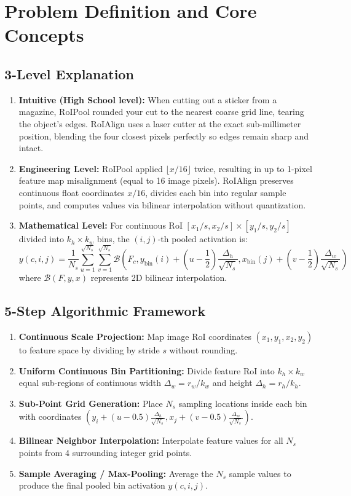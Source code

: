 \documentclass[11pt,a4paper]{article}
\theoremstyle{definition}
\begin{document}
\section{Problem Definition and Core Concepts}

\subsection{3-Level Explanation}
\begin{enumerate}
    \item \textbf{Intuitive (High School level):} When cutting out a sticker from a magazine, RoIPool rounded your cut to the nearest coarse grid line, tearing the object's edges. RoIAlign uses a laser cutter at the exact sub-millimeter position, blending the four closest pixels perfectly so edges remain sharp and intact.
    \item \textbf{Engineering Level:} RoIPool applied $\lfloor x/16 \rfloor$ twice, resulting in up to 1-pixel feature map misalignment (equal to 16 image pixels). RoIAlign preserves continuous float coordinates $x/16$, divides each bin into regular sample points, and computes values via bilinear interpolation without quantization.
    \item \textbf{Mathematical Level:} For continuous RoI $[x_1/s, x_2/s] \times [y_1/s, y_2/s]$ divided into $k_h \times k_w$ bins, the $(i, j)$-th pooled activation is:
    \begin{equation}
    y(c, i, j) = \frac{1}{N_s} \sum_{u=1}^{\sqrt{N_s}} \sum_{v=1}^{\sqrt{N_s}} \mathcal{B}\left( F_c, y_{\text{bin}}(i) + \left(u - \frac{1}{2}\right)\frac{\Delta_h}{\sqrt{N_s}}, x_{\text{bin}}(j) + \left(v - \frac{1}{2}\right)\frac{\Delta_w}{\sqrt{N_s}} \right)
    \end{equation}
    where $\mathcal{B}(F, y, x)$ represents 2D bilinear interpolation.
\end{enumerate}

\subsection{5-Step Algorithmic Framework}
\begin{enumerate}
    \item \textbf{Continuous Scale Projection:} Map image RoI coordinates $(x_1, y_1, x_2, y_2)$ to feature space by dividing by stride $s$ without rounding.
    \item \textbf{Uniform Continuous Bin Partitioning:} Divide feature RoI into $k_h \times k_w$ equal sub-regions of continuous width $\Delta_w = r_w / k_w$ and height $\Delta_h = r_h / k_h$.
    \item \textbf{Sub-Point Grid Generation:} Place $N_s$ sampling locations inside each bin with coordinates $(y_i + (u - 0.5)\frac{\Delta_h}{\sqrt{N_s}}, x_j + (v - 0.5)\frac{\Delta_w}{\sqrt{N_s}})$.
    \item \textbf{Bilinear Neighbor Interpolation:} Interpolate feature values for all $N_s$ points from 4 surrounding integer grid points.
    \item \textbf{Sample Averaging / Max-Pooling:} Average the $N_s$ sample values to produce the final pooled bin activation $y(c, i, j)$.
\end{enumerate}
\end{document}
